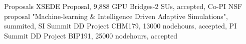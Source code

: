 \begin{rubric}{Proposals}
\entry*[\hspace{1.05cm}2021]%
  XSEDE Proposal, 9,888 GPU Bridges-2 SUs, accepted, Co-PI
\entry*[2020]%
  NSF proposal "Machine-learning \& Intelligence Driven Adaptive Simulations", summited, SI
\entry*[2020]%
  Summit DD Project CHM179, 13000 nodehours, accepted, PI
\entry*[2019]%
  Summit DD Project BIP191, 25000 nodehours, accepted 


\end{rubric}